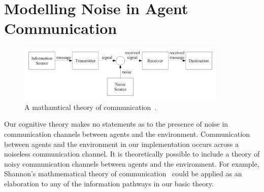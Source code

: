 \section{Modelling Noise in Agent Communication}

\begin{figure}[bth]
  \center
  \includegraphics[width=10cm]{gfx/communication_theory}
  \caption[A mathematical theory of communication]{A mathamtical
    theory of communication~\citep{shannon:1959}.}
  \label{fig:communication_theory}
\end{figure}

Our cognitive theory makes no statements as to the presence of noise
in communication channels between agents and the environment.
Communication between agents and the environment in our implementation
occurs across a noiseless communication channel.  It is theoretically
possible to include a theory of noisy communication channels between
agents and the environment.  For example, Shannon's mathmematical
theory of communication~\citep{shannon:1959} could be applied as an
elaboration to any of the information pathways in our basic theory.


%
%
